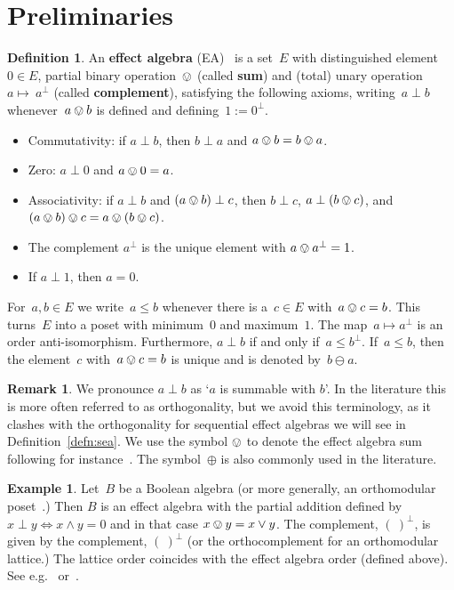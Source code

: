 \documentclass[a4paper, onecolumn, accepted=2020-12-22]{quantumarticle}
\newcommand\Define[1]{\textbf{#1}}
\newcounter{counter}
\theoremstyle{definition}
\newtheorem{definition}[counter]{Definition}
\newtheorem{example}[counter]{Example}
\newtheorem{remark}[counter]{Remark}
\begin{document}
\section{Preliminaries}\label{sec:prelims}

\begin{definition}
    An \Define{effect algebra}
    (EA)~\cite{foulis1994effect} is a set~$E$ with
    distinguished element~$0 \in E$,
    partial binary operation~$\ovee$ (called \Define{sum})
    and (total) unary operation~$a \mapsto~a^\perp$ (called \Define{complement}),
    satisfying the following axioms,
    writing~$a\perp b$ whenever~$a \ovee b$ is defined
        and defining~$1 := 0^\perp$.
\begin{itemize}
\item Commutativity: if $a\perp b$, then $b \perp a$ and $a\ovee b = b \ovee a$.
\item Zero: $a\perp 0$ and $a\ovee 0 = a$.
\item Associativity: if $a\perp b$ and $(a\ovee b)\perp c$, then
    $b\perp c$,
$a\perp (b \ovee c)$, and $(a\ovee b) \ovee c = a\ovee (b\ovee c)$.
\item The complement
    $a^\perp$ is the unique element with $a \ovee a^\perp = 1$.
\item If $a\perp 1$, then $a=0$.
\end{itemize}
For~$a,b \in E$ we write~$a \leq b$ whenever there is a~$c \in E$
    with~$a \ovee c = b$.
This turns~$E$ into a poset with minimum~$0$ and maximum~$1$.
The map~$a \mapsto a^\perp$ is an order anti-isomorphism.
Furthermore, $a \perp b$ if and only if~$a \leq b^\perp$.
If~$a \leq b$, then the element~$c$ with~$a \ovee c = b$
    is unique and is denoted by~$b \ominus a$.
\end{definition}

\begin{remark}
    We pronounce $a\perp b$ as `$a$ is summable with $b$'.
    In the literature this is more often referred to as orthogonality,
    but we avoid this terminology,
    as it clashes with the orthogonality 
    for sequential effect algebras
    we will see in Definition~\ref{defn:sea}.
    We use the symbol $\ovee$ to denote the effect algebra sum
    following for instance~\cite{jacobs2012coreflections,kentathesis}. The symbol~$\oplus$ is also commonly used in the literature.
\end{remark}

\begin{example}\label{ex:orthomodularlattice}
    Let~$B$ be a Boolean algebra (or more generally, an orthomodular
        poset~\cite{holland1975current,maeda,loomis}.)
    Then $B$ is an effect algebra with the partial addition defined by 
    $x\perp y \iff x\wedge y = 0$ and in that case  $x\ovee y = x\vee y$.
    The complement, $(\ )^\perp$, is given by the complement, $(\ )^\perp$
    (or the orthocomplement for an orthomodular lattice.)
    The lattice order coincides with the effect algebra order (defined
    above). See e.g.~\cite[Prop.~27]{basmaster}
    or~\cite[\S5]{foulis1994effect}.
\end{example}
\end{document}
